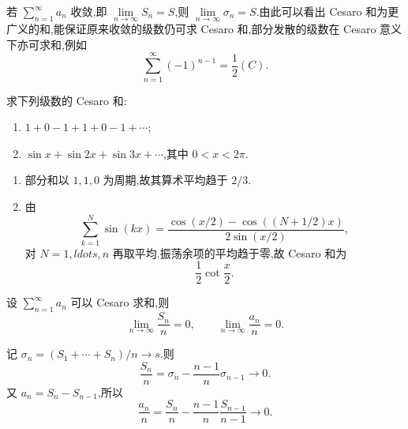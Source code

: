\begin{remark}
    若 $\displaystyle\sum\limits_{n=1}^{\infty}a_n$ 收敛,即 $\displaystyle\lim\limits_{n\to\infty}S_n=S$,则 $\displaystyle\lim\limits_{n\to\infty}\sigma_n=S$.由此可以看出 Cesaro 和为更广义的和,能保证原来收敛的级数仍可求 Cesaro 和,部分发散的级数在 Cesaro 意义下亦可求和,例如
    \[
        \displaystyle\sum\limits_{n=1}^{\infty}(-1)^{n-1}=\dfrac{1}{2}(C).
    \]
\end{remark}

\begin{example}
    求下列级数的 Cesaro 和:
    \begin{enumerate}
        \item $1+0-1+1+0-1+\cdots$;
        \item $\sin x+\sin2x+\sin3x+\cdots$,其中 $0<x<2\pi$.
    \end{enumerate}
\end{example}
\exampleblank

\begin{solution}
    \leavevmode
    \begin{enumerate}
        \item 部分和以 $1,1,0$ 为周期,故其算术平均趋于 $\boxed{2/3}$.
        \item 由
              \[
                  \displaystyle\sum\limits_{k=1}^{N}\sin(kx)
                  =\dfrac{\cos(x/2)-\cos((N+1/2)x)}{2\sin(x/2)},
              \]
              对 $N=1,ldots,n$ 再取平均.振荡余项的平均趋于零,故 Cesaro 和为
              \[
                  \boxed{\dfrac{1}{2}\cot\dfrac{x}{2}}.
              \]
    \end{enumerate}
\end{solution}

\begin{example}
    设 $\displaystyle\sum\limits_{n=1}^{\infty}a_n$ 可以 Cesaro 求和,则
    \[
        \displaystyle\lim\limits_{n\to\infty}\dfrac{S_n}{n}=0,
        \qquad
        \lim\limits_{n\to\infty}\dfrac{a_n}{n}=0.
    \]
\end{example}
\exampleblank

\begin{solution}
    记 $\sigma_n=(S_1+\cdots+S_n)/n\to s$.则
    \[
        \dfrac{S_n}{n}=\sigma_n-\dfrac{n-1}{n}\sigma_{n-1}\longrightarrow0.
    \]
    又 $a_n=S_n-S_{n-1}$,所以
    \[
        \dfrac{a_n}{n}=\dfrac{S_n}{n}-\dfrac{n-1}{n}\dfrac{S_{n-1}}{n-1}\longrightarrow0.
    \]
\end{solution}

